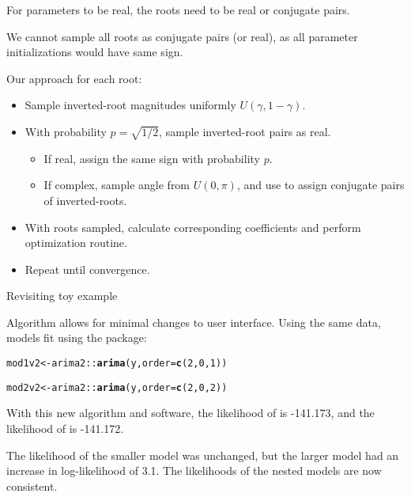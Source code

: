 \documentclass[aspectratio=169]{beamer}\usepackage[]{graphicx}\usepackage[]{xcolor}
\makeatletter
\newcommand{\hlnum}[1]{\textcolor[rgb]{0.686,0.059,0.569}{#1}}%
\newcommand{\hlopt}[1]{\textcolor[rgb]{0,0,0}{#1}}%
\newcommand{\hldef}[1]{\textcolor[rgb]{0.345,0.345,0.345}{#1}}%
\newcommand{\hlkwb}[1]{\textcolor[rgb]{0.69,0.353,0.396}{#1}}%
\newcommand{\hlkwc}[1]{\textcolor[rgb]{0.333,0.667,0.333}{#1}}%
\newcommand{\hlkwd}[1]{\textcolor[rgb]{0.737,0.353,0.396}{\textbf{#1}}}%
\newenvironment{kframe}{%
 \def\at@end@of@kframe{}%
 \ifinner\ifhmode%
  \def\at@end@of@kframe{\end{minipage}}%
  \begin{minipage}{\columnwidth}%
 \fi\fi%
 \def\FrameCommand##1{\hskip\@totalleftmargin \hskip-\fboxsep
 \colorbox{shadecolor}{##1}\hskip-\fboxsep
     \hskip-\linewidth \hskip-\@totalleftmargin \hskip\columnwidth}%
 \MakeFramed {\advance\hsize-\width
   \@totalleftmargin\z@ \linewidth\hsize
   \@setminipage}}%
 {\par\unskip\endMakeFramed%
 \at@end@of@kframe}
\newenvironment{knitrout}{}{} %
\makeatother
\begin{document}
\begin{frame}
  For parameters to be real, the roots need to be real or conjugate pairs. 
  
  We cannot sample all roots as conjugate pairs (or real), as all parameter initializations would have same sign.
  
  Our approach for each root:
  \begin{itemize}
    \item Sample inverted-root magnitudes uniformly $U(\gamma, 1-\gamma)$.
    \item With probability $p = \sqrt{1/2}$, sample inverted-root pairs as real.
    \begin{itemize}
      \item If real, assign the same sign with probability $p$.
      \item If complex, sample angle from $U(0, \pi)$, and use to assign conjugate pairs of inverted-roots.
    \end{itemize}
    \item With roots sampled, calculate corresponding coefficients and perform optimization routine.
    \item Repeat until convergence.
  \end{itemize}
\end{frame}

\begin{frame}{Revisiting toy example}

Algorithm allows for minimal changes to user interface.
Using the same data, models fit using the  package:



\begin{knitrout}
\color{fgcolor}\begin{kframe}
\begin{alltt}
\hldef{mod1v2} \hlkwb{<-} \hldef{arima2}\hlopt{::}\hlkwd{arima}\hldef{(y,} \hlkwc{order} \hldef{=} \hlkwd{c}\hldef{(}\hlnum{2}\hldef{,} \hlnum{0}\hldef{,} \hlnum{1}\hldef{))}

\hldef{mod2v2} \hlkwb{<-} \hldef{arima2}\hlopt{::}\hlkwd{arima}\hldef{(y,} \hlkwc{order} \hldef{=} \hlkwd{c}\hldef{(}\hlnum{2}\hldef{,} \hlnum{0}\hldef{,} \hlnum{2}\hldef{))}
\end{alltt}
\end{kframe}
\end{knitrout}

With this new algorithm and software, the likelihood of  is -141.173, and the likelihood of  is -141.172.

\pause
The likelihood of the smaller model was unchanged, but the larger model had an increase in log-likelihood of 3.1. The likelihoods of the nested models are now \alert{consistent}.
\end{frame}
\end{document}
